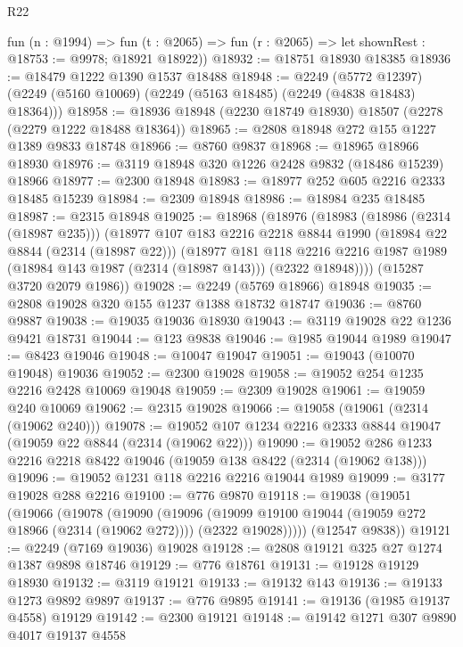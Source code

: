 \begin{lexlean}{R22}
\begin{coremodule}
      fun (n : @1994) =>
      fun (t : @2065) => fun (r : @2065) => let shownRest : @18753 := @9978; @18921 @18922))
@18932 := @18751 @18930 @18385
@18936 := @18479 @1222 @1390 @1537 @18488
@18948 := @2249
    (@5772 @12397)
    (@2249 (@5160 @10069) (@2249 (@5163 @18485) (@2249 (@4838 @18483) @18364)))
@18958 := @18936 @18948 (@2230 @18749 @18930) @18507 (@2278 (@2279 @1222 @18488 @18364))
@18965 := @2808 @18948 @272 @155 @1227 @1389 @9833 @18748
@18966 := @8760 @9837
@18968 := @18965 @18966 @18930
@18976 := @3119 @18948 @320 @1226 @2428 @9832 (@18486 @15239) @18966
@18977 := @2300 @18948
@18983 := @18977 @252 @605 @2216 @2333 @18485 @15239
@18984 := @2309 @18948
@18986 := @18984 @235 @18485
@18987 := @2315 @18948
@19025 := @18968
    (@18976
      (@18983
        (@18986 (@2314 (@18987 @235)))
        (@18977
          @107
          @183
          @2216
          @2218
          @8844
          @1990
          (@18984 @22 @8844 (@2314 (@18987 @22)))
          (@18977
            @181
            @118
            @2216
            @2216
            @1987
            @1989
            (@18984 @143 @1987 (@2314 (@18987 @143)))
            (@2322 @18948))))
      (@15287 @3720 @2079 @1986))
@19028 := @2249 (@5769 @18966) @18948
@19035 := @2808 @19028 @320 @155 @1237 @1388 @18732 @18747
@19036 := @8760 @9887
@19038 := @19035 @19036 @18930
@19043 := @3119 @19028 @22 @1236 @9421 @18731
@19044 := @123 @9838
@19046 := @1985 @19044 @1989
@19047 := @8423 @19046
@19048 := @10047 @19047
@19051 := @19043 (@10070 @19048) @19036
@19052 := @2300 @19028
@19058 := @19052 @254 @1235 @2216 @2428 @10069 @19048
@19059 := @2309 @19028
@19061 := @19059 @240 @10069
@19062 := @2315 @19028
@19066 := @19058 (@19061 (@2314 (@19062 @240)))
@19078 := @19052 @107 @1234 @2216 @2333 @8844 @19047 (@19059 @22 @8844 (@2314 (@19062 @22)))
@19090 := @19052 @286 @1233 @2216 @2218 @8422 @19046 (@19059 @138 @8422 (@2314 (@19062 @138)))
@19096 := @19052 @1231 @118 @2216 @2216 @19044 @1989
@19099 := @3177 @19028 @288 @2216
@19100 := @776 @9870
@19118 := @19038
    (@19051
      (@19066
        (@19078
          (@19090
            (@19096
              (@19099 @19100 @19044 (@19059 @272 @18966 (@2314 (@19062 @272))))
              (@2322 @19028)))))
      (@12547 @9838))
@19121 := @2249 (@7169 @19036) @19028
@19128 := @2808 @19121 @325 @27 @1274 @1387 @9898 @18746
@19129 := @776 @18761
@19131 := @19128 @19129 @18930
@19132 := @3119 @19121
@19133 := @19132 @143
@19136 := @19133 @1273 @9892 @9897
@19137 := @776 @9895
@19141 := @19136 (@1985 @19137 @4558) @19129
@19142 := @2300 @19121
@19148 := @19142 @1271 @307 @9890 @4017 @19137 @4558

\end{coremodule}
\end{lexlean}

